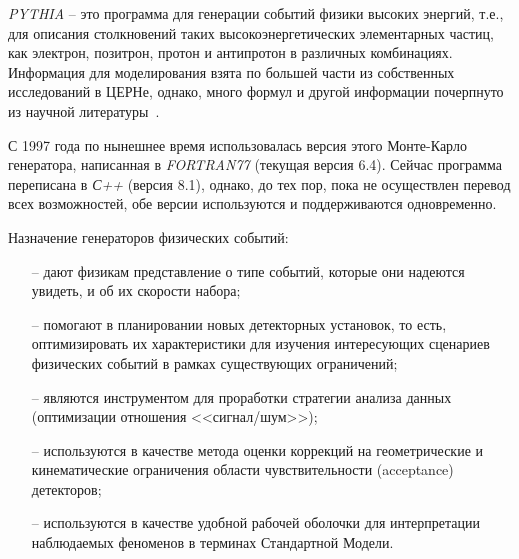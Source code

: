 \textit{PYTHIA} -- это программа для генерации событий физики
высоких энергий, т.е., для описания столкновений таких
высокоэнергетических элементарных частиц, как электрон,
позитрон, протон и антипротон в различных комбинациях.
Информация для моделирования взята по большей части из
собственных исследований в ЦЕРНе, однако, много формул и
другой информации почерпнуто из научной литературы~\cite{review-pythia}.

С 1997 года по нынешнее время использовалась версия
этого Монте-Карло генератора, написанная в \textit{FORTRAN77}
(текущая версия 6.4). Сейчас программа переписана в \textit{С++}
(версия 8.1), однако, до тех пор, пока не осуществлен
перевод всех возможностей, обе версии используются и
поддерживаются одновременно.


Назначение генераторов физических событий:
\begin{itemize}
	\item[--] дают физикам представление о типе событий, которые
	они надеются увидеть, и об их скорости набора;
	\item[--] помогают в планировании новых детекторных установок,
	то есть, оптимизировать их характеристики для изучения
	интересующих сценариев физических событий в рамках
	существующих ограничений;
	\item[--] являются инструментом для проработки стратегии
	анализа данных (оптимизации отношения <<сигнал/шум>>);
	\item[--] используются в качестве метода оценки коррекций на
	геометрические и кинематические ограничения области
	чувствительности (acceptance) детекторов;
	\item[--] используются в качестве удобной рабочей оболочки для
	интерпретации наблюдаемых феноменов в терминах
	Стандартной Модели.
\end{itemize}

